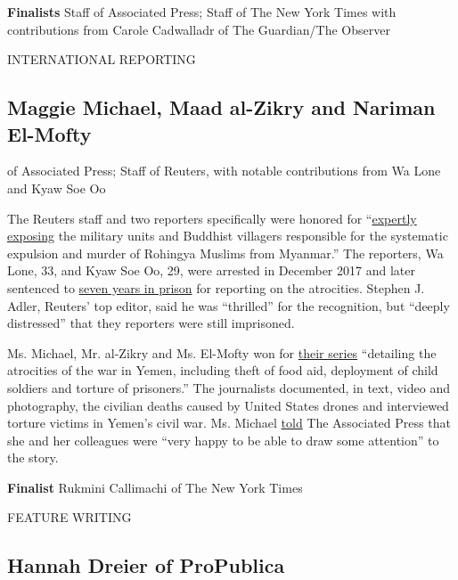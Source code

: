 \textbf{Finalists} Staff of Associated Press; Staff of The New York
Times with contributions from Carole Cadwalladr of The Guardian/The
Observer

INTERNATIONAL REPORTING

\hypertarget{maggie-michael-maad-al-zikry-and-nariman-el-mofty}{%
\subsection{Maggie Michael, Maad al-Zikry and Nariman
El-Mofty}\label{maggie-michael-maad-al-zikry-and-nariman-el-mofty}}

of Associated Press; Staff of Reuters, with notable contributions from
Wa Lone and Kyaw Soe Oo

The Reuters staff and two reporters specifically were honored for
``\href{https://www.reuters.com/investigates/section/myanmar-rohingya/}{expertly
exposing} the military units and Buddhist villagers responsible for the
systematic expulsion and murder of Rohingya Muslims from Myanmar.'' The
reporters, Wa Lone, 33, and Kyaw Soe Oo, 29, were arrested in December
2017 and later sentenced to
\href{https://www.nytimes3xbfgragh.onion/2018/09/03/world/asia/myanmar-reuters-journalists-sentenced-trial.html}{seven
years in prison} for reporting on the atrocities. Stephen J. Adler,
Reuters' top editor, said he was ``thrilled'' for the recognition, but
``deeply distressed'' that they reporters were still imprisoned.

Ms. Michael, Mr. al-Zikry and Ms. El-Mofty won for
\href{https://apnews.com/YemenDirtyWar}{their series} ``detailing the
atrocities of the war in Yemen, including theft of food aid, deployment
of child soldiers and torture of prisoners.'' The journalists
documented, in text, video and photography, the civilian deaths caused
by United States drones and interviewed torture victims in Yemen's civil
war. Ms. Michael
\href{https://apnews.com/44f2f36b0c7b46b19b2fa32e6904b06c}{told} The
Associated Press that she and her colleagues were ``very happy to be
able to draw some attention'' to the story.

\textbf{Finalist} Rukmini Callimachi of The New York Times

FEATURE WRITING

\hypertarget{hannah-dreier-of-propublica}{%
\subsection{Hannah Dreier of
ProPublica}\label{hannah-dreier-of-propublica}}

